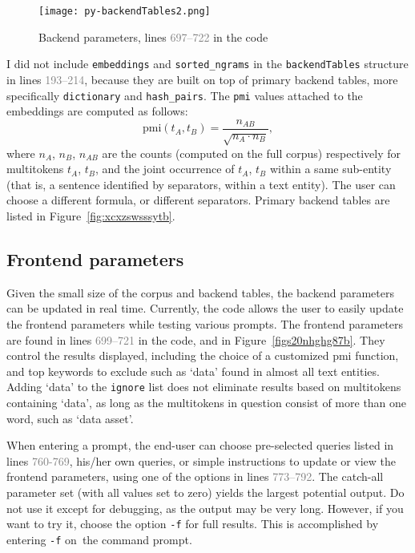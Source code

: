 \documentclass[10pt]{article}
\begin{document}
\begin{figure}[H]
\centering
\texttt{[image: py-backendTables2.png]}
\caption{Backend parameters, lines \textcolor{gray}{697--722} in the code}
\label{fig:hheg09ytucghg87b}
\end{figure}

I did not include \texttt{embeddings} and \texttt{sorted\_ngrams} in the \texttt{backendTables} structure in lines 
\textcolor{gray}{193--214}, because they are built on top of primary backend tables, more specifically  
\texttt{dictionary} and \texttt{hash\_pairs}. The \texttt{pmi} values attached to the embeddings are
 computed as follows:
\begin{equation}
\text{pmi}(t_A, t_B) = \frac{n_{AB}}{\sqrt{n_A\cdot  n_B}}, \label{porx} 
\end{equation}
where $n_A$, $n_B$, $n_{AB}$ are the counts (computed on the full corpus) respectively for multitokens $t_A$, $t_B$, and the joint 
occurrence of $t_A$, $t_B$ within a same
 sub-entity (that is, a sentence identified by separators, within a text entity). The user can choose a different formula, or different
 separators. Primary backend tables are listed in Figure~\ref{fig:xcxzswsssytb}.


\subsection{Frontend parameters}

Given the small size of the corpus and backend tables, the backend parameters can be updated in real time. Currently, the code allows the user to easily update the frontend parameters while testing various prompts. The frontend parameters are found in lines \textcolor{gray}{ 699--721} 
in the code, and in Figure~\ref{figs20nhghg87b}. They control
 the results displayed, including the choice of a customized pmi function, and top keywords to exclude such as `data' found in almost all text entities. 
Adding `data' to the \texttt{ignore} list does not eliminate results based on multitokens containing `data', as long as the multitokens in question consist of more than one word, such as `data asset'.   



When entering a prompt, the end-user can choose pre-selected queries listed in lines \textcolor{gray}{760-769}, his/her own queries, or 
simple instructions to update or view the frontend parameters, using one of the options in lines \textcolor{gray}{773--792}. 
The catch-all parameter set (with all values set to zero) yields the largest potential output. Do not use it except for debugging, as the output
 may be very long. However, if you want to try it, choose the option \texttt{-f} for full results. This is accomplished by entering \texttt{-f} on~the command prompt.  
\end{document}

